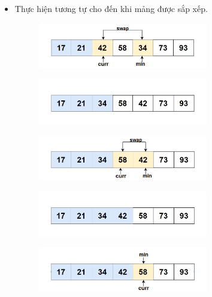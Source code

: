 \begin{itemize}
\item  Thực hiện tương tự cho đến khi mảng được sắp xếp.
\begin{figure}[H]
    \centering
    \includegraphics[width=0.7\textwidth]{img/selection sort/6.png} 
\end{figure}

\begin{figure}[H]
    \centering
    \includegraphics[width=0.7\textwidth]{img/selection sort/7.png} 
\end{figure}

\begin{figure}[H]
    \centering
    \includegraphics[width=0.7\textwidth]{img/selection sort/8.png} 
\end{figure}

\begin{figure}[H]
    \centering
    \includegraphics[width=0.7\textwidth]{img/selection sort/9.png} 
\end{figure}

\begin{figure}[H]
    \centering
    \includegraphics[width=0.7\textwidth]{img/selection sort/10.png} 
\end{figure}


\end{itemize}
